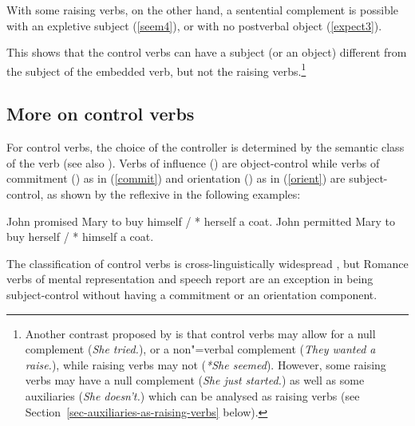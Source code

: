 \documentclass[output=paper
	        ,collection
	        ,collectionchapter
 	        ,biblatex
                ,babelshorthands
                ,newtxmath
                ,draftmode
                ,colorlinks, citecolor=brown
]{langscibook}
\begin{document}
\eal
{}
\zl

\eal
{}
\zl

With some raising verbs, on the other hand, a sentential complement is possible with an expletive subject (\ref{seem4}), or with no postverbal object (\ref{expect3}).

\eal
{}
\zl

This shows that the control verbs can have a subject (or an object) different from the subject of the embedded verb, but not the raising verbs.\footnote{Another contrast proposed by \citet{Jacobson1990} is that control verbs may allow for a null complement (\emph{She tried.}), or a non"=verbal complement (\emph{They wanted a raise.}), while raising verbs may not (\emph{*She seemed}). However, some raising verbs may have a null complement (\emph{She just started.}) as well as some auxiliaries (\emph{She doesn't.}) which can be analysed as raising verbs (see Section~\ref{sec-auxiliaries-as-raising-verbs} below).}

\subsection{More on control verbs}

For control verbs, the choice of the controller is determined by the semantic class of the verb \citet{PollardandSag1992} (see also \citealt{JackendoffandCulicover2003}).  Verbs of influence () are object-control
while verbs of commitment () as in (\ref{commit}) and orientation () as in (\ref{orient}) are subject-control, as shown by the reflexive in the following examples:

\begin{exe}
	\ex \begin{xlist}
	\ex John promised Mary to buy himself / * herself a coat. \label{commit}
   \ex 	John permitted Mary to buy herself / * himself a coat.\label{orient}
 \end{xlist}
 \end{exe}
 
  The classification of control verbs is cross-linguistically widespread \citep{VanValinandLapolla1997}, but Romance verbs of mental representation and speech report are an exception in being subject-control without having a commitment or an orientation component.
\end{document}
